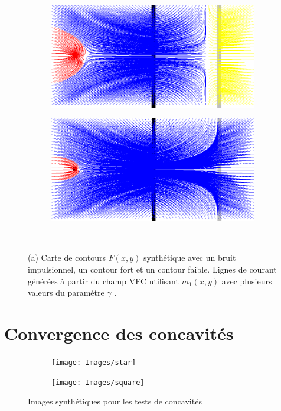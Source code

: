 \begin{figure}[!h]
   \begin{subfigure}[c]{.5\linewidth}
     \centering
     \includegraphics[scale=0.35]{Chapters/Images/synthetic_map_VFC_gamma017.png}
     \caption{}
   \end{subfigure}
   \begin{subfigure}[c]{.5\linewidth}
     \centering
     \includegraphics[scale=0.35]{Chapters/Images/synthetic_map_VFC_gamma011.png}
     \caption{}
   \end{subfigure}\\
   
   \caption{(a) Carte de contours $F(x,y)$ synthétique avec un bruit impulsionnel, un contour fort et un contour faible. Lignes de courant générées à partir du champ VFC utilisant $m_1(x,y)$ avec plusieurs valeurs du paramètre $\gamma$ .}
   \label{fig:synthetic_map}
\end{figure}

\section{Convergence des concavités}
\begin{figure}[H]

\begin{subfigure}[c]{.5\textwidth}
\centering
\texttt{[image: Images/star]}
\caption{}
\end{subfigure}
\begin{subfigure}[c]{.5\textwidth}
\centering
\texttt{[image: Images/square]}
\caption{}
\end{subfigure}
\caption{Images synthétiques pour les tests de concavités}
\label{fig:ann_synthetic_star_square}
\end{figure}

